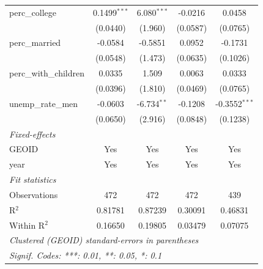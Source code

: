 \documentclass[A4paper,12pt]{article}
\begin{document}
\begin{appendices}
\begin{table}[ht]
{\begin{tabular}{lcccc}
   perc\_college                                         & 0.1499$^{***}$ & 6.080$^{***}$ & -0.0216  & 0.0458\\   
                                                         & (0.0440)       & (1.960)       & (0.0587) & (0.0765)\\   
   perc\_married                                         & -0.0584        & -0.5851       & 0.0952   & -0.1731\\   
                                                         & (0.0548)       & (1.473)       & (0.0635) & (0.1026)\\   
   perc\_with\_children                                  & 0.0335         & 1.509         & 0.0063   & 0.0333\\   
                                                         & (0.0396)       & (1.810)       & (0.0469) & (0.0765)\\   
   unemp\_rate\_men                                      & -0.0603        & -6.734$^{**}$ & -0.1208  & -0.3552$^{***}$\\   
                                                         & (0.0650)       & (2.916)       & (0.0848) & (0.1238)\\   
   \midrule
   \emph{Fixed-effects}\\
   GEOID                                                 & Yes            & Yes           & Yes      & Yes\\  
   year                                                  & Yes            & Yes           & Yes      & Yes\\  
   \midrule
   \emph{Fit statistics}\\
   Observations                                          & 472            & 472           & 472      & 439\\  
   R$^2$                                                 & 0.81781        & 0.87239       & 0.30091  & 0.46831\\  
   Within R$^2$                                          & 0.16650        & 0.19805       & 0.03479  & 0.07075\\  
   \midrule \midrule
   \multicolumn{5}{l}{\emph{Clustered (GEOID) standard-errors in parentheses}}\\
   \multicolumn{5}{l}{\emph{Signif. Codes: ***: 0.01, **: 0.05, *: 0.1}}\\
\end{tabular}}
\end{table}


\end{appendices}
\end{document}
